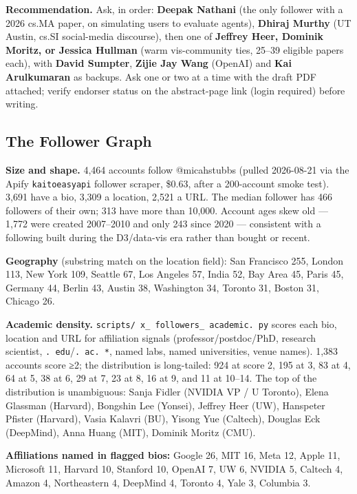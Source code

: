 \documentclass[twocolumn,10pt,letterpaper]{article}
\begin{document}
\textbf{Recommendation.} Ask, in order: \textbf{Deepak Nathani} (the only follower with a 2026 cs.MA paper, on simulating users to evaluate agents), \textbf{Dhiraj Murthy} (UT Austin, cs.SI social-media discourse), then one of \textbf{Jeffrey Heer, Dominik Moritz, or Jessica Hullman} (warm vis-community ties, 25–39 eligible papers each), with \textbf{David Sumpter}, \textbf{Zijie Jay Wang} (OpenAI) and \textbf{Kai Arulkumaran} as backups. Ask one or two at a time with the draft PDF attached; verify endorser status on the abstract-page link (login required) before writing.


\subsection{The Follower Graph}

\textbf{Size and shape.} 4,464 accounts follow @micahstubbs (pulled 2026-08-21 via the Apify \texttt{kaitoeasyapi} follower scraper, \$0.63, after a 200-account smoke test). 3,691 have a bio, 3,309 a location, 2,521 a URL. The median follower has 466 followers of their own; 313 have more than 10,000. Account ages skew old — 1,772 were created 2007–2010 and only 243 since 2020 — consistent with a following built during the D3/data-vis era rather than bought or recent.


\textbf{Geography} (substring match on the location field): San Francisco 255, London 113, New York 109, Seattle 67, Los Angeles 57, India 52, Bay Area 45, Paris 45, Germany 44, Berlin 43, Austin 38, Washington 34, Toronto 31, Boston 31, Chicago 26.


\textbf{Academic density.} \texttt{scripts/ x\_ followers\_ academic. py} scores each bio, location and URL for affiliation signals (professor/postdoc/PhD, research scientist, \texttt{. edu}/\texttt{. ac. *}, named labs, named universities, venue names). 1,383 accounts score ≥2; the distribution is long-tailed: 924 at score 2, 195 at 3, 83 at 4, 64 at 5, 38 at 6, 29 at 7, 23 at 8, 16 at 9, and 11 at 10–14. The top of the distribution is unambiguous: Sanja Fidler (NVIDIA VP / U Toronto), Elena Glassman (Harvard), Bongshin Lee (Yonsei), Jeffrey Heer (UW), Hanspeter Pfister (Harvard), Vasia Kalavri (BU), Yisong Yue (Caltech), Douglas Eck (DeepMind), Anna Huang (MIT), Dominik Moritz (CMU).


\textbf{Affiliations named in flagged bios:} Google 26, MIT 16, Meta 12, Apple 11, Microsoft 11, Harvard 10, Stanford 10, OpenAI 7, UW 6, NVIDIA 5, Caltech 4, Amazon 4, Northeastern 4, DeepMind 4, Toronto 4, Yale 3, Columbia 3.
\end{document}

